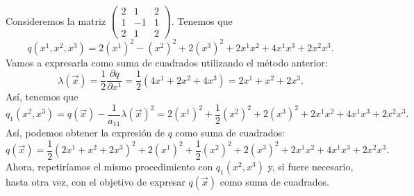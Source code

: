 \begin{eg}
	\normalfont Consideremos la matriz $\displaystyle \begin{pmatrix} 2 & 1 & 2 \\ 1 & - 1 & 1 \\ 2 & 1 & 2 \end{pmatrix} $. Tenemos que 
	\[q\left(x^{1}, x^{2}, x^{3}\right) = 2\left(x^{1}\right)^{2} - \left(x^{2}\right)^{2} + 2\left(x^{3}\right)^{2} + 2x^{1}x^{2} + 4x^{1}x^{3}+2x^{2}x^{3} .\]
	Vamos a expresarla como suma de cuadrados utilizando el método anterior:
	\[ \lambda\left(\vec{x}\right) = \frac{1}{2}\frac{\partial q}{\partial x^{1}} = \frac{1}{2}\left(4x^{1}+2x^{2}+4x^{3}\right) = 2x^{1} + x^{2} + 2x^{3} .\]
	Así, tenemos que 
	\[q_{1}\left(x^{2}, x^{3}\right) = q\left(\vec{x}\right)-\frac{1}{a_{11}}\lambda\left(\vec{x}\right)^{2} = 2\left(x^{1}\right)^{2}+\frac{1}{2}\left(x^{2}\right)^{2} + 2\left(x^{3}\right)^{2}+2x^{1}x^{2}+4x^{1}x^{3}+2x^{2}x^{3}.\]
	Así, podemos obtener la expresión de $\displaystyle q $ como suma de cuadrados:
	\[q\left(\vec{x}\right) = \frac{1}{2}\left(2x^{1}+x^{2}+2x^{3}\right)^{2} +2\left(x^{1}\right)^{2}+\frac{1}{2}\left(x^{2}\right)^{2} + 2\left(x^{3}\right)^{2}+2x^{1}x^{2}+4x^{1}x^{3}+2x^{2}x^{3}  .\]
	Ahora, repetiríamos el mismo procedimiento con $\displaystyle q_{1}\left(x^{2}, x^{3}\right) $ y, si fuere necesario, hasta otra vez, con el objetivo de expresar $\displaystyle q\left(\vec{x}\right) $ como suma de cuadrados.
\end{eg}
